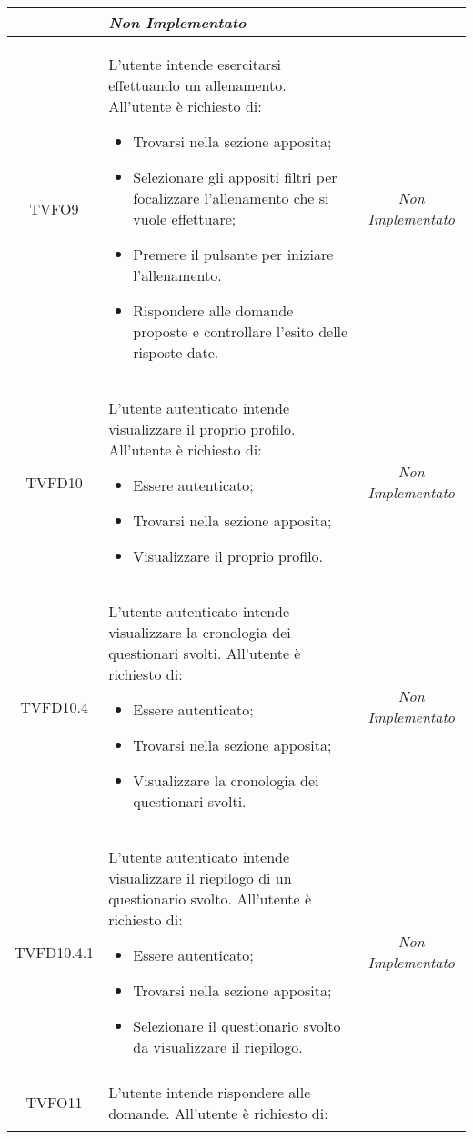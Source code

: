 \begin{longtable}[ht]{|c|>{}m{8cm}|c|}
\begin{itemize}
\end{itemize} & \textit{Non Implementato}\\ \hline
\hypertarget{TVFO9}{TVFO9} & L’utente intende esercitarsi effettuando un allenamento. All’utente è richiesto di:
\begin{itemize}
\item Trovarsi nella sezione apposita;
\item Selezionare gli appositi filtri per focalizzare l’allenamento che si vuole effettuare;
\item Premere il pulsante per iniziare l’allenamento.
\item Rispondere alle domande proposte e controllare l’esito delle risposte date.
\end{itemize} & \textit{Non Implementato}\\ \hline
\hypertarget{TVFD10}{TVFD10} & L’utente autenticato  intende visualizzare il proprio profilo. All’utente è richiesto di:
\begin{itemize}
\item Essere autenticato;
\item Trovarsi nella sezione apposita;
\item Visualizzare il proprio profilo.
\end{itemize} & \textit{Non Implementato}\\ \hline
\hypertarget{TVFD10.4}{TVFD10.4} & L’utente autenticato  intende visualizzare la cronologia dei questionari svolti. All’utente è richiesto di:
\begin{itemize}
\item Essere autenticato;
\item Trovarsi nella sezione apposita;
\item Visualizzare la cronologia dei questionari svolti.
\end{itemize} & \textit{Non Implementato}\\ \hline
\hypertarget{TVFD10.4.1}{TVFD10.4.1} & L’utente autenticato  intende visualizzare il riepilogo di un questionario svolto. All’utente è richiesto di:
\begin{itemize}
\item Essere autenticato;
\item Trovarsi nella sezione apposita;
\item Selezionare il questionario svolto da visualizzare il riepilogo.
\end{itemize} & \textit{Non Implementato}\\ \hline
\hypertarget{TVFO11}{TVFO11} & L’utente  intende rispondere alle domande. All’utente è richiesto di:

\end{longtable}
